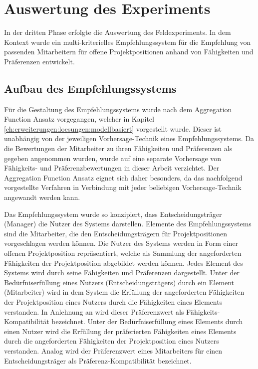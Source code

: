 \section{Auswertung des Experiments}
In der dritten Phase erfolgte die Auswertung des Feldexperiments.
In dem Kontext wurde ein multi-kriterielles Empfehlungssystem für die Empfehlung von passenden Mitarbeitern für offene Projektpositionen anhand von Fähigkeiten und Präferenzen entwickelt.

\subsection{Aufbau des Empfehlungssystems}
Für die Gestaltung des Empfehlungssystems wurde nach dem Aggregation Function Ansatz vorgegangen, welcher in Kapitel \ref{ch:erweiterungen:loesungen:modellbasiert} vorgestellt wurde.
Dieser ist unabhängig von der jeweiligen Vorhersage-Technik eines Empfehlungssystems.
Da die Bewertungen der Mitarbeiter zu ihren Fähigkeiten und Präferenzen als gegeben angenommen wurden, wurde auf eine separate Vorhersage von Fähigkeits- und Präferenzbewertungen in dieser Arbeit verzichtet.
Der Aggregation Function Ansatz eignet sich daher besonders, da das nachfolgend vorgestellte Verfahren in Verbindung mit jeder beliebigen Vorhersage-Technik angewandt werden kann.

Das Empfehlungssystem wurde so konzipiert, dass Entscheidungsträger (Manager) die Nutzer des Systems darstellen.
Elemente des Empfehlungssystems sind die Mitarbeiter, die den Entscheidungsträgern für Projektpositionen vorgeschlagen werden können.
Die Nutzer des Systems werden in Form einer offenen Projektposition repräsentiert, welche als Sammlung der angeforderten Fähigkeiten der Projektposition abgebildet werden können.
Jedes Element des Systems wird durch seine Fähigkeiten und Präferenzen dargestellt.
Unter der Bedürfniserfüllung eines Nutzers (Entscheidungsträgers) durch ein Element (Mitarbeiter) wird in dem System die Erfüllung der angeforderten Fähigkeiten der Projektposition eines Nutzers durch die Fähigkeiten eines Elements verstanden.
In Anlehnung an \textcite[S. 207ff.]{pizzato:2010} wird dieser Präferenzwert als Fähigkeits-Kompatibilität bezeichnet.
Unter der Bedürfniserfüllung eines Elements durch einen Nutzer wird die Erfüllung der präferierten Fähigkeiten eines Elements durch die angeforderten Fähigkeiten der Projektposition eines Nutzers verstanden.
Analog wird der Präferenzwert eines Mitarbeiters für einen Entscheidungsträger als Präferenz-Kompatibilität bezeichnet.

